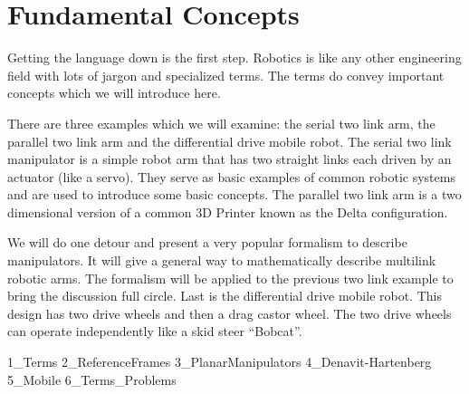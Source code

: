 \hypertarget{Chap:Terms}{%
\section{Fundamental Concepts}\label{Chap:Terms}}

Getting the language down is the first step. Robotics is like any other
engineering field with lots of jargon and specialized terms. The terms
do convey important concepts which we will introduce here.

There are three examples which we will examine: the serial two link arm,
the parallel two link arm and the differential drive mobile robot. The
serial two link manipulator is a simple robot arm that has two straight
links each driven by an actuator (like a servo). They serve as basic
examples of common robotic systems and are used to introduce some basic
concepts. The parallel two link arm is a two dimensional version of a
common 3D Printer known as the Delta configuration.

We will do one detour and present a very popular formalism to describe
manipulators. It will give a general way to mathematically describe
multilink robotic arms. The formalism will be applied to the previous
two link example to bring the discussion full circle. Last is the
differential drive mobile robot. This design has two drive wheels and
then a drag castor wheel. The two drive wheels can operate independently
like a skid steer ``Bobcat''.

1\_Terms 2\_ReferenceFrames 3\_PlanarManipulators 4\_Denavit-Hartenberg
5\_Mobile 6\_Terms\_Problems
